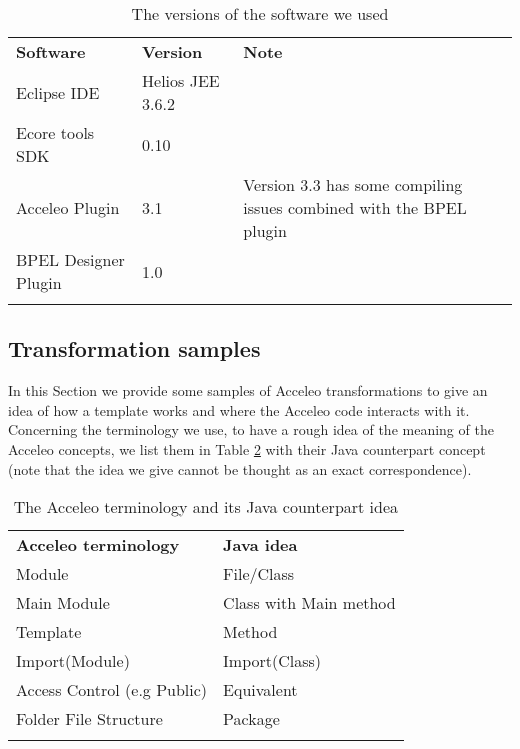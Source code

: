 \begin{table}
\caption{The versions of the software we used}
\label{tab:softwareVersions}
\begin{center}
\begin{tabular}{l l p{7cm}}
						\toprule
						\addlinespace[0.2cm]
\textbf{Software} 	& \textbf{Version} 	& \textbf{Note} 	\\ 
						\cmidrule(l){1-3}
Eclipse IDE 			& Helios JEE 3.6.2				& 	\\[0,1cm]		
Ecore tools SDK			& 0.10						&  	\\[0,1cm]
Acceleo Plugin			& 3.1						& Version 3.3 has some compiling issues combined with the BPEL plugin    	\\[0,1cm]
BPEL Designer Plugin 		& 1.0						&  	\\[0,1cm]

						\addlinespace[0.2cm]
						\bottomrule
\end{tabular}
\end{center}
\end{table}

\subsection{Transformation samples}
\label{sec:codeSamples}
In this Section we provide some samples of Acceleo transformations to give an idea of how a template works and where the Acceleo code interacts with it. 
Concerning the terminology we use, to have a rough idea of the meaning of the Acceleo concepts, we list them in Table \ref{tab:terminology} with their Java counterpart concept (note that the idea we give cannot be thought as an exact correspondence).
\begin{table}[h!]
\caption{The Acceleo terminology and its Java counterpart idea}
\label{tab:terminology}
\begin{center}
\begin{tabular}{p{6cm} l} %
						\toprule
						\addlinespace[0.2cm]
\textbf{Acceleo terminology} 	& \textbf{Java idea} 	\\ 
						\cmidrule(l){1-2}
Module 				& File/Class				 	\\[0,1cm]		
Main Module			& Class with Main method		\\[0,1cm]
Template			& Method			  	\\[0,1cm]
Import(Module)			& Import(Class)			    	\\[0,1cm]
Access Control (e.g Public)	& Equivalent 					\\[0,1cm]
Folder File Structure		& Package				\\[0,1cm]

						\addlinespace[0.2cm]
						\bottomrule
\end{tabular}
\end{center}
\end{table}


